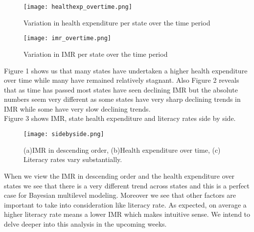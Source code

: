 \documentclass{article}
\begin{document}
 \begin{figure}[H]
\centering
\texttt{[image: healthexp\_overtime.png]}
\caption{Variation in health expenditure per state over the time period}
\label{deltat}
\end{figure}

 \begin{figure}[H]
\centering
\texttt{[image: imr\_overtime.png]}
\caption{Variation in IMR per state over the time period}
\label{deltat}
\end{figure}
\newpage
Figure 1 shows us that many states have undertaken a higher health expenditure over time while many have remained relatively stagnant. Also Figure 2 reveals that as time has passed most states have seen declining IMR but the absolute numbers seem very different as some states have very sharp declining trends in IMR while some have very slow declining trends.\\
Figure 3 shows IMR, state health expenditure and literacy rates side by side.
 \begin{figure}[H]
\centering
\texttt{[image: sidebyside.png]}
\caption{(a)IMR in descending order, (b)Health expenditure over time, (c) Literacy rates vary substantially.}
\label{deltat}
\end{figure}
When we view the IMR in descending order and the health expenditure over states we see that there is a very different trend across states and this is a perfect case for Bayesian multilevel modeling. Moreover we see that other factors are important to take into consideration like literacy rate. As expected, on average a higher literacy rate means a lower IMR which makes intuitive sense. We intend to delve deeper into this analysis in the upcoming weeks.
\end{document}
